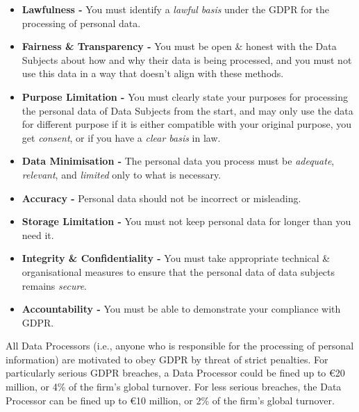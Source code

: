 \documentclass[a4paper]{article}
\begin{document}
\begin{itemize}
    \item \textbf{Lawfulness -} You must identify a \textit{lawful basis} under the GDPR for the processing of personal data.
    \item \textbf{Fairness \& Transparency -} You must be open \& honest with the Data Subjects about how and why their data is being processed, and you must not use this data in a way that doesn't align with these methods. 
    \item \textbf{Purpose Limitation -} You must clearly state your purposes for processing the personal data of Data Subjects from the start, and may only use the data for different purpose if it is either compatible with your original purpose, you get \textit{consent}, or if you have a \textit{clear basis} in law.
    \item \textbf{Data Minimisation -} The personal data you process must be \textit{adequate}, \textit{relevant}, and \textit{limited} only to what is necessary.
    \item \textbf{Accuracy -} Personal data should not be incorrect or misleading.
    \item \textbf{Storage Limitation -} You must not keep personal data for longer than you need it.
    \item \textbf{Integrity \& Confidentiality -} You must take appropriate technical \& organisational measures to ensure that the personal data of data subjects remains \textit{secure}.
    \item \textbf{Accountability -} You must be able to demonstrate your compliance with GDPR.
\end{itemize}
\bigbreak

All Data Processors (i.e., anyone who is responsible for the processing of personal information) are motivated to obey GDPR by threat of strict penalties. For particularly serious GDPR breaches, a Data Processor could be fined up to €20 million, or 4\% of the firm's global turnover. For less serious breaches, the Data Processor can be fined up to €10 million, or 2\% of the firm's global turnover.
\end{document}
